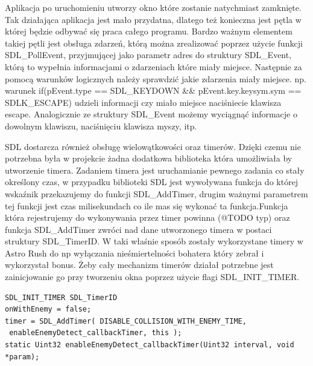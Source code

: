 Aplikacja po uruchomieniu utworzy okno które zostanie natychmiast zamknięte. Tak działająca aplikacja jest mało przydatna, dlatego też konieczna jest pętla w której będzie odbywać się praca całego programu. Bardzo ważnym elementem takiej pętli jest obsługa zdarzeń, którą można zrealizować poprzez użycie funkcji SDL\_PollEvent, przyjmującej jako parametr adres do struktury SDL\_Event, którą to wypełnia informacjami o zdarzeniach które miały miejsce. Następnie za pomocą warunków logicznych należy sprawdzić jakie zdarzenia miały miejsce. np. warunek if(pEvent.type == SDL\_KEYDOWN \&\& pEvent.key.keysym.sym == SDLK\_ESCAPE)  
udzieli informacji czy miało miejsce naciśniecie klawisza escape. Analogicznie ze struktury SDL\_Event możemy wyciągnąć informacje o dowolnym klawiszu, naciśnięciu klawisza myszy, itp. 

SDL dostarcza również obsługę wielowątkowości oraz timerów. Dzięki czemu nie potrzebna była w projekcie żadna dodatkowa biblioteka która umożliwiała by utworzenie timera. Zadaniem timera jest uruchamianie pewnego zadania co stały określony czas, w przypadku biblioteki SDL jest wywoływana funkcja do której wskaźnik przekazujemy do funkcji  SDL\_AddTimer, drugim ważnymi parametrem tej funkcji jest czas milisekundach co ile mas się wykonać ta funkcja.Funkcja która rejestrujemy do wykonywania przez timer powinna (@TODO typ) oraz funkcja SDL\_AddTimer zwróci nad dane utworzonego timera w postaci struktury SDL\_TimerID. W taki właśnie sposób zostały wykorzystane timery w Astro Rush do np wyłączania nieśmiertelności bohatera który zebrał i wykorzystał bonus. Żeby cały mechanizm timerów działał potrzebne jest zainicjowanie go przy tworzeniu okna poprzez użycie flagi SDL\_INIT\_TIMER.
\begin{verbatim} 
SDL_INIT_TIMER SDL_TimerID
onWithEnemy = false;
timer = SDL_AddTimer( DISABLE_COLLISION_WITH_ENEMY_TIME,
 enableEnemyDetect_callbackTimer, this );
static Uint32 enableEnemyDetect_callbackTimer(Uint32 interval, void *param);
\end{verbatim}

